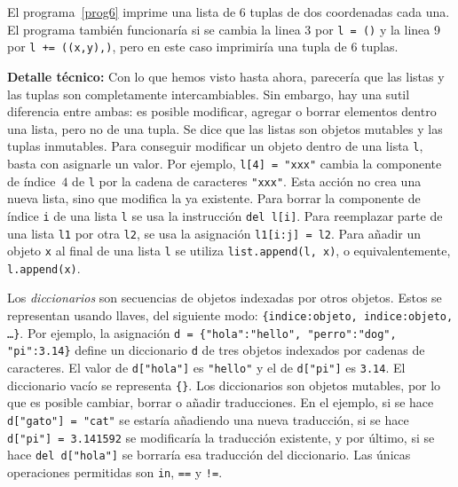 \documentclass[a4paper, 11pt]{article}
\theoremstyle{plain}
\theoremstyle{definition}
\begin{document}
\bigskip



\bigskip

El programa~\ref{prog6} imprime una lista de 6 tuplas de dos coordenadas
cada una. El programa también funcionaría si se cambia la linea 3 por
\texttt{l = ()} y la linea 9 por \texttt{l += ((x,y),)}, pero en este
caso imprimiría una tupla de 6 tuplas.

\bigskip

{\bf Detalle técnico:} Con lo que hemos visto hasta ahora, parecería que
las listas y las tuplas son completamente intercambiables. Sin embargo,
hay una sutil diferencia entre ambas: es posible modificar, agregar o
borrar elementos dentro una lista, pero no de una tupla. Se dice que las
listas son objetos mutables y las tuplas inmutables. Para conseguir
modificar un objeto dentro de una lista \texttt{l}, basta con asignarle
un valor. Por ejemplo, \texttt{l[4] = "xxx"} cambia la componente de
índice~$4$ de \texttt{l} por la cadena de caracteres \texttt{"xxx"}.
Esta acción no crea una nueva lista, sino que modifica la ya existente.
Para borrar la componente de índice \texttt{i} de una lista \texttt{l} se usa
la instrucción \texttt{del l[i]}. Para reemplazar parte de una lista
\texttt{l1} por otra \texttt{l2}, se usa la asignación
\texttt{l1[i:j] = l2}. Para añadir un objeto \texttt{x} al final de una
lista \texttt{l} se utiliza \texttt{list.append(l, x)}, o equivalentemente,
\texttt{l.append(x)}.

\bigskip



\bigskip

Los \emph{diccionarios} son secuencias de objetos indexadas por otros objetos.
Estos se representan usando llaves, del siguiente modo:
\texttt{\{indice:objeto, indice:objeto, \ldots\}}. Por ejemplo, la asignación
\texttt{d = \{"hola":"hello", "perro":"dog", "pi":3.14\}} define un diccionario
\texttt{d} de tres objetos indexados por cadenas de caracteres. El valor de
\texttt{d["hola"]} es \texttt{"hello"} y el de \texttt{d["pi"]} es \texttt{3.14}.
El diccionario vacío se representa \texttt{\{\}}. Los diccionarios son
objetos mutables, por lo que es posible cambiar, borrar o añadir traducciones.
En el ejemplo, si se hace \texttt{d["gato"] = "cat"} se estaría añadiendo
una nueva traducción, si se hace \texttt{d["pi"] = 3.141592} se modificaría
la traducción existente, y por último, si se hace \texttt{del d["hola"]} se
borraría esa traducción del diccionario. Las únicas operaciones permitidas
son \texttt{in}, \texttt{==} y \texttt{!=}.
\end{document}
